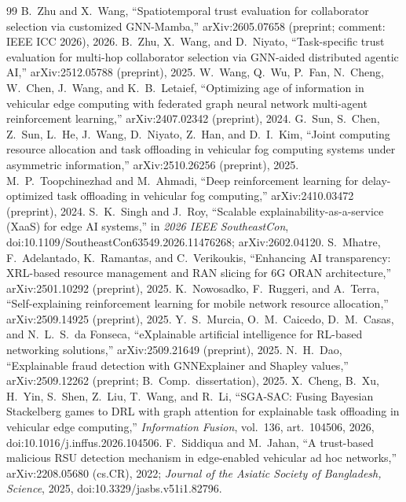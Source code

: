 \begin{thebibliography}{99}
 B.~Zhu and X.~Wang, ``Spatiotemporal trust evaluation for collaborator selection via customized GNN-Mamba,'' arXiv:2605.07658 (preprint; comment: IEEE ICC 2026), 2026.
 B.~Zhu, X.~Wang, and D.~Niyato, ``Task-specific trust evaluation for multi-hop collaborator selection via GNN-aided distributed agentic AI,'' arXiv:2512.05788 (preprint), 2025.
 W.~Wang, Q.~Wu, P.~Fan, N.~Cheng, W.~Chen, J.~Wang, and K.~B.~Letaief, ``Optimizing age of information in vehicular edge computing with federated graph neural network multi-agent reinforcement learning,'' arXiv:2407.02342 (preprint), 2024.
 G.~Sun, S.~Chen, Z.~Sun, L.~He, J.~Wang, D.~Niyato, Z.~Han, and D.~I.~Kim, ``Joint computing resource allocation and task offloading in vehicular fog computing systems under asymmetric information,'' arXiv:2510.26256 (preprint), 2025.
 M.~P.~Toopchinezhad and M.~Ahmadi, ``Deep reinforcement learning for delay-optimized task offloading in vehicular fog computing,'' arXiv:2410.03472 (preprint), 2024.
 S.~K.~Singh and J.~Roy, ``Scalable explainability-as-a-service (XaaS) for edge AI systems,'' in \emph{2026 IEEE SoutheastCon}, doi:10.1109/SoutheastCon63549.2026.11476268; arXiv:2602.04120.
 S.~Mhatre, F.~Adelantado, K.~Ramantas, and C.~Verikoukis, ``Enhancing AI transparency: XRL-based resource management and RAN slicing for 6G ORAN architecture,'' arXiv:2501.10292 (preprint), 2025.
 K.~Nowosadko, F.~Ruggeri, and A.~Terra, ``Self-explaining reinforcement learning for mobile network resource allocation,'' arXiv:2509.14925 (preprint), 2025.
 Y.~S.~Murcia, O.~M.~Caicedo, D.~M.~Casas, and N.~L.~S.~da Fonseca, ``eXplainable artificial intelligence for RL-based networking solutions,'' arXiv:2509.21649 (preprint), 2025.
 N.~H.~Dao, ``Explainable fraud detection with GNNExplainer and Shapley values,'' arXiv:2509.12262 (preprint; B.~Comp.\ dissertation), 2025.
 X.~Cheng, B.~Xu, H.~Yin, S.~Shen, Z.~Liu, T.~Wang, and R.~Li, ``SGA-SAC: Fusing Bayesian Stackelberg games to DRL with graph attention for explainable task offloading in vehicular edge computing,'' \emph{Information Fusion}, vol.~136, art.~104506, 2026, doi:10.1016/j.inffus.2026.104506.
 F.~Siddiqua and M.~Jahan, ``A trust-based malicious RSU detection mechanism in edge-enabled vehicular ad hoc networks,'' arXiv:2208.05680 (cs.CR), 2022; \emph{Journal of the Asiatic Society of Bangladesh, Science}, 2025, doi:10.3329/jasbs.v51i1.82796.

\end{thebibliography}
